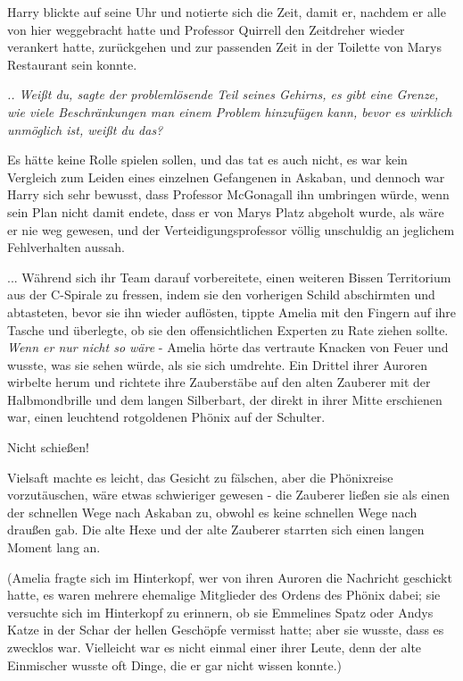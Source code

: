 Harry blickte auf seine Uhr und notierte sich die Zeit, damit er, nachdem er
alle von hier weggebracht hatte und Professor Quirrell den Zeitdreher wieder
verankert hatte, zurückgehen und zur passenden Zeit in der Toilette von Marys
Restaurant sein konnte.

\emph{.. Weißt du, sagte der problemlösende Teil seines Gehirns, es gibt eine
Grenze, wie viele Beschränkungen man einem Problem hinzufügen kann, bevor es
wirklich unmöglich ist, weißt du das?}

Es hätte keine Rolle spielen sollen, und das tat es auch nicht, es war kein
Vergleich zum Leiden eines einzelnen Gefangenen in Askaban, und dennoch war
Harry sich sehr bewusst, dass Professor McGonagall ihn umbringen würde, wenn
sein Plan nicht damit endete, dass er von Marys Platz abgeholt wurde, als wäre
er nie weg gewesen, und der Verteidigungsprofessor völlig unschuldig an
jeglichem Fehlverhalten aussah.

... Während sich ihr Team darauf vorbereitete, einen weiteren Bissen Territorium
aus der C-Spirale zu fressen, indem sie den vorherigen Schild abschirmten und
abtasteten, bevor sie ihn wieder auflösten, tippte Amelia mit den Fingern auf
ihre Tasche und überlegte, ob sie den offensichtlichen Experten zu Rate ziehen
sollte. \emph{Wenn er nur nicht so wäre} - Amelia hörte das vertraute Knacken
von Feuer und wusste, was sie sehen würde, als sie sich umdrehte. Ein Drittel
ihrer Auroren wirbelte herum und richtete ihre Zauberstäbe auf den alten
Zauberer mit der Halbmondbrille und dem langen Silberbart, der direkt in ihrer
Mitte erschienen war, einen leuchtend rotgoldenen Phönix auf der Schulter.

\glqq{}Nicht schießen!\grqq{}

Vielsaft machte es leicht, das Gesicht zu fälschen, aber die Phönixreise
vorzutäuschen, wäre etwas schwieriger gewesen - die Zauberer ließen sie als
einen der schnellen Wege nach Askaban zu, obwohl es keine schnellen Wege nach
draußen gab. Die alte Hexe und der alte Zauberer starrten sich einen langen
Moment lang an.

(Amelia fragte sich im Hinterkopf, wer von ihren Auroren die Nachricht geschickt
hatte, es waren mehrere ehemalige Mitglieder des Ordens des Phönix dabei; sie
versuchte sich im Hinterkopf zu erinnern, ob sie Emmelines Spatz oder Andys
Katze in der Schar der hellen Geschöpfe vermisst hatte; aber sie wusste, dass es
zwecklos war. Vielleicht war es nicht einmal einer ihrer Leute, denn der alte
Einmischer wusste oft Dinge, die er gar nicht wissen konnte.)

